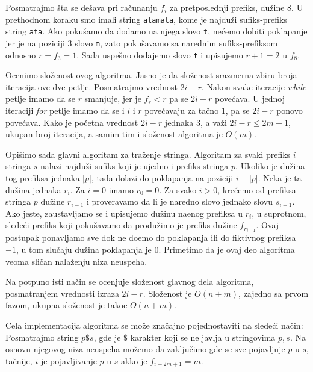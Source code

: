 Posmatrajmo \v sta se de\v sava pri ra\v cunanju $f_i$ za pretposlednji prefiks, du\v zine $8$. U prethodnom koraku smo imali string \texttt{atamata}, kome je najdu\v zi sufiks-prefiks string \texttt{ata}. Ako poku\v samo da dodamo na njega slovo \texttt{t}, ne\' cemo dobiti poklapanje jer je na poziciji $3$ slovo \texttt{m}, zato poku\v savamo sa narednim sufiks-prefiksom odnosno $r = f_3 = 1$. Sada uspe\v sno dodajemo slovo \texttt{t} i upisujemo $r+1 = 2$ u $f_8$.



Ocenimo slo\v zenost ovog algoritma. Jasno je da slo\v zenost srazmerna zbiru broja iteracija ove dve petlje. Posmatrajmo vrednost $2i-r$. Nakon svake iteracije \textit{while} petlje imamo da se $r$ smanjuje, jer je $f_r < r$ pa se $2i-r$ pove\' cava. U jednoj iteraciji \textit{for} petlje imamo da se i $i$ i $r$ pove\' cavaju za ta\v cno $1$, pa se $2i-r$ ponovo pove\' cava. Kako je po\v cetna vrednost $2i-r$ jednaka $3$, a va\v zi $2i-r \leq 2m+1$, ukupan broj iteracija, a samim tim i slo\v zenost algoritma je $O(m)$.

Opi\v simo sada glavni algoritam za tra\v zenje stringa. Algoritam za svaki prefiks $i$ stringa $s$ nalazi najdu\v zi sufiks koji je ujedno i prefiks stringa $p$. Ukoliko je du\v zina tog prefiksa jednaka $|p|$, tada dolazi do poklapanja na poziciji $i-|p|$. Neka je ta du\v zina jednaka $r_i$. Za $i=0$ imamo $r_0 = 0$. Za svako $i>0$, kre\' cemo od prefiksa stringa $p$ du\v zine $r_{i-1}$ i proveravamo da li je naredno slovo jednako slovu $s_{i-1}$. Ako jeste, zaustavljamo se i upisujemo du\v zinu na\dj enog prefiksa u $r_i$, u suprotnom, slede\' ci prefiks koji poku\v savamo da produ\v zimo je prefiks du\v zine $f_{r_{i-1}}$. Ovaj postupak ponavljamo sve dok ne do\dj emo do poklapanja ili do fiktivnog prefiksa $-1$, u tom slu\v caju du\v zina poklapanja je $0$. Primetimo da je ovaj deo algoritma veoma sli\v can nala\v zenju niza neuspeha.



Na potpuno isti na\v cin se ocenjuje slo\v zenost glavnog dela algoritma, posmatranjem vrednosti izraza $2i-r$. Slo\v zenost je $O(n+m)$, zajedno sa prvom fazom, ukupna slo\v zenost je tako\dj e $O(n+m)$.

Cela implementacija algoritma se mo\v ze zna\v cajno pojednostaviti na slede\' ci na\v cin: Posmatrajmo string $p\$s$, gde je $\$$ karakter koji se ne javlja u stringovima $p,s$. Na osnovu njegovog niza neuspeha mo\v zemo da zaklju\v cimo gde se sve pojavljuje $p$ u $s$, ta\v cnije, $i$ je pojavljivanje $p$ u $s$ akko je $f_{i+2m+1} = m$.

